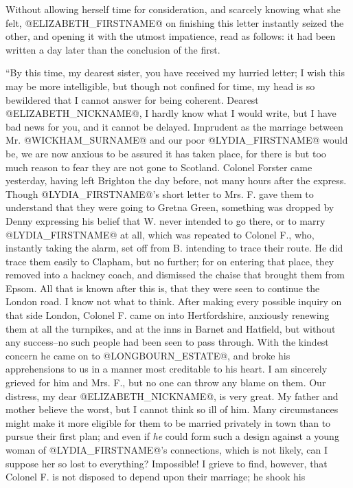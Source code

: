 Without allowing herself time for consideration, and scarcely knowing
what she felt, @ELIZABETH_FIRSTNAME@ on finishing this letter instantly seized the
other, and opening it with the utmost impatience, read as follows: it
had been written a day later than the conclusion of the first.

``By this time, my dearest sister, you have received my hurried letter; I
wish this may be more intelligible, but though not confined for time, my
head is so bewildered that I cannot answer for being coherent. Dearest
@ELIZABETH_NICKNAME@, I hardly know what I would write, but I have bad news for you,
and it cannot be delayed. Imprudent as the marriage between Mr. @WICKHAM_SURNAME@
and our poor @LYDIA_FIRSTNAME@ would be, we are now anxious to be assured it has
taken place, for there is but too much reason to fear they are not gone
to Scotland. Colonel Forster came yesterday, having left Brighton the
day before, not many hours after the express. Though @LYDIA_FIRSTNAME@'s short
letter to Mrs. F. gave them to understand that they were going to Gretna
Green, something was dropped by Denny expressing his belief that W.
never intended to go there, or to marry @LYDIA_FIRSTNAME@ at all, which was
repeated to Colonel F., who, instantly taking the alarm, set off from B.
intending to trace their route. He did trace them easily to Clapham,
but no further; for on entering that place, they removed into a hackney
coach, and dismissed the chaise that brought them from Epsom. All that
is known after this is, that they were seen to continue the London road.
I know not what to think. After making every possible inquiry on that
side London, Colonel F. came on into Hertfordshire, anxiously renewing
them at all the turnpikes, and at the inns in Barnet and Hatfield, but
without any success--no such people had been seen to pass through. With
the kindest concern he came on to @LONGBOURN_ESTATE@, and broke his apprehensions
to us in a manner most creditable to his heart. I am sincerely grieved
for him and Mrs. F., but no one can throw any blame on them. Our
distress, my dear @ELIZABETH_NICKNAME@, is very great. My father and mother believe the
worst, but I cannot think so ill of him. Many circumstances might make
it more eligible for them to be married privately in town than to pursue
their first plan; and even if \textit{he} could form such a design against a
young woman of @LYDIA_FIRSTNAME@'s connections, which is not likely, can I suppose
her so lost to everything? Impossible! I grieve to find, however, that
Colonel F. is not disposed to depend upon their marriage; he shook his
